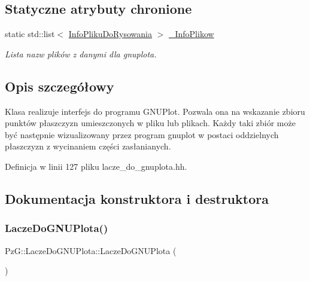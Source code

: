 \subsection*{Statyczne atrybuty chronione}
\begin{DoxyCompactItemize}
\item 
static std\+::list$<$ \mbox{\hyperlink{class_pz_g_1_1_info_pliku_do_rysowania}{Info\+Pliku\+Do\+Rysowania}} $>$ \mbox{\hyperlink{class_pz_g_1_1_lacze_do_g_n_u_plota_a1916c5a6fecfb3554e9d5204b2f2086c}{\+\_\+\+Info\+Plikow}}
\begin{DoxyCompactList}\small\item\em Lista nazw plików z danymi dla {\itshape gnuplota}. \end{DoxyCompactList}\end{DoxyCompactItemize}


\subsection{Opis szczegółowy}
Klasa realizuje interfejs do programu G\+N\+U\+Plot. Pozwala ona na wskazanie zbioru punktów płaszczyzn umieszczonych w pliku lub plikach. Każdy taki zbiór może być następnie wizualizowany przez program gnuplot w postaci oddzielnych płaszczyzn z wycinaniem części zasłanianych. 

Definicja w linii 127 pliku lacze\+\_\+do\+\_\+gnuplota.\+hh.



\subsection{Dokumentacja konstruktora i destruktora}
\mbox{\label{class_pz_g_1_1_lacze_do_g_n_u_plota_a5845189b5ab8c3634acf57024e5deeaf}} 
\subsubsection{\texorpdfstring{LaczeDoGNUPlota()}{LaczeDoGNUPlota()}}
{\footnotesize\ttfamily Pz\+G\+::\+Lacze\+Do\+G\+N\+U\+Plota\+::\+Lacze\+Do\+G\+N\+U\+Plota (\begin{DoxyParamCaption}{ }\end{DoxyParamCaption})}



